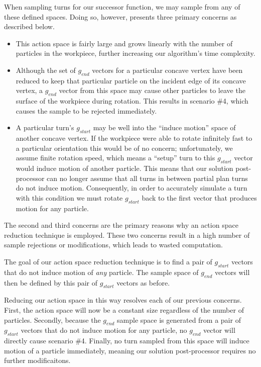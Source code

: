 
When sampling turns for our successor function, we may sample from any of these defined spaces. Doing so, however, presents three primary concerns as described below.

\begin{itemize}
\item This action space is fairly large and grows linearly with the number of particles in the workpiece, further increasing our algorithm's time complexity.
\item Although the set of $g_{end}$ vectors for a particular concave vertex have been reduced to keep that particular particle on the incident edge of its concave vertex, a $g_{end}$ vector from this space may cause other particles to leave the surface of the workpiece during rotation. This results in scenario \#4, which causes the sample to be rejected immediately.
\item A particular turn's $g_{start}$ may be well into the ``induce motion'' space of another concave vertex. If the workpiece were able to rotate infinitely fast to a particular orientation this would be of no concern; unfortunately, we assume finite rotation speed, which means a ``setup'' turn to this $g_{start}$ vector would induce motion of another particle. This means that our solution post-processor can no longer assume that all turns in between partial plan turns do not induce motion. Consequently, in order to accurately simulate a turn with this condition we must rotate $g_{start}$ back to the first vector that produces motion for any particle.
\end{itemize}

The second and third concerns are the primary reasons why an action space reduction technique is employed. These two concerns result in a high number of sample rejections or modifications, which leads to wasted computation.

The goal of our action space reduction technique is to find a pair of $g_{start}$ vectors that do not induce motion of \emph{any} particle. The sample space of $g_{end}$ vectors will then be defined by this pair of $g_{start}$ vectors as before.

Reducing our action space in this way resolves each of our previous concerns. First, the action space will now be a constant size regardless of the number of particles. Secondly, because the $g_{end}$ sample space is generated from a pair of $g_{start}$ vectors that do not induce motion for any particle, no $g_{end}$ vector will directly cause scenario \#4. Finally, no turn sampled from this space will induce motion of a particle immediately, meaning our solution post-processor requires no further modificaitons.

